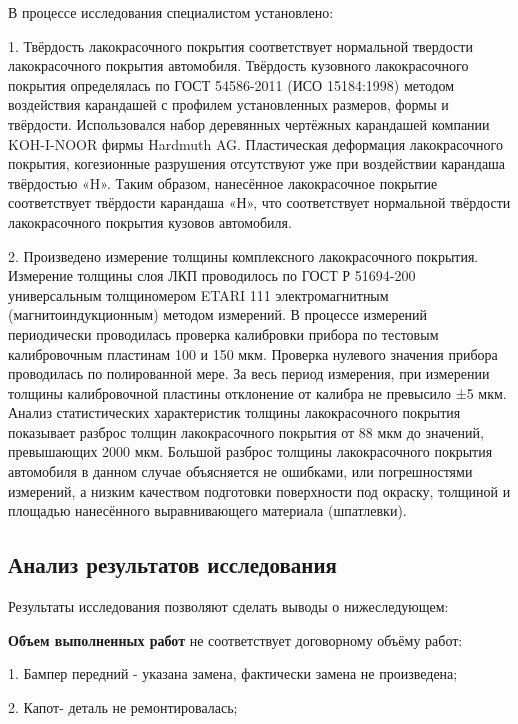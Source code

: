 {  \noindent В процессе исследования специалистом установлено:
  
  1.  Твёрдость лакокрасочного покрытия соответствует нормальной твердости лакокрасочного покрытия автомобиля. Твёрдость кузовного
  лакокрасочного покрытия определялась по ГОСТ 54586-2011 (ИСО 15184:1998) методом
  воздействия карандашей с профилем установленных размеров, формы и твёрдости.
  Использовался набор деревянных чертёжных карандашей компании KOH-I-NOOR фирмы
  Hardmuth AG. Пластическая деформация лакокрасочного покрытия, когезионные
  разрушения отсутствуют уже при воздействии карандаша твёрдостью «H». Таким образом,
  нанесённое лакокрасочное покрытие соответствует твёрдости карандаша «Н», что
  соответствует нормальной твёрдости лакокрасочного покрытия кузовов автомобиля.
  
  
  2. Произведено измерение толщины комплексного лакокрасочного покрытия.
  Измерение толщины слоя ЛКП проводилось по ГОСТ Р 51694-200 универсальным
  толщиномером ETARI 111 электромагнитным (магнитоиндукционным) методом измерений.
  В процессе измерений периодически проводилась проверка калибровки прибора по тестовым
  калибровочным пластинам 100 и 150 мкм. Проверка нулевого значения прибора проводилась
  по полированной мере. За весь период измерения, при измерении толщины калибровочной
  пластины отклонение от калибра не превысило ±5 мкм. 
  Анализ статистических характеристик толщины лакокрасочного покрытия показывает
  разброс толщин лакокрасочного покрытия от 88 мкм до значений, превышающих 2000 мкм.
  Большой разброс толщины лакокрасочного покрытия автомобиля в данном случае
  объясняется не ошибками, или погрешностями измерений, а низким качеством подготовки
  поверхности под окраску, толщиной и площадью нанесённого выравнивающего материала
  (шпатлевки).
  
 \subsection{Анализ результатов исследования}   
 
  
 
  Результаты исследования позволяют сделать выводы о нижеследующем:
  
  \indent \textbf{Объем выполненных работ} не соответствует договорному объёму работ:
  
  1. Бампер передний - указана замена, фактически замена не произведена;
  
  2. Капот- деталь  не ремонтировалась;
  
}
